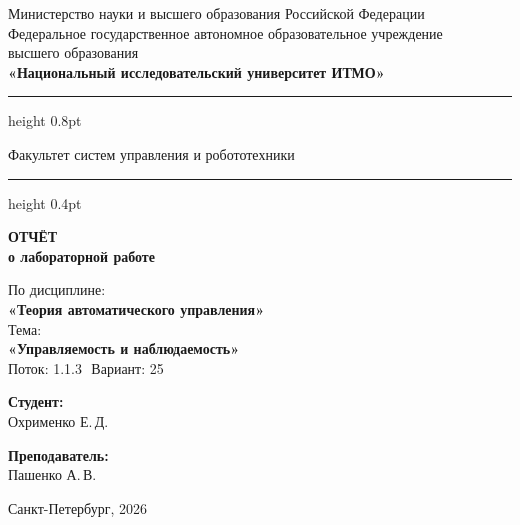 \documentclass[a4paper,12pt]{article}
\begin{document}
	
	\begin{titlepage}
		\centering
		
		\vspace*{0.5cm}
		{\small
			Министерство науки и высшего образования Российской Федерации\\[2pt]
			Федеральное государственное автономное образовательное учреждение\\
			высшего образования\\[2pt]
			\textbf{«Национальный исследовательский университет ИТМО»}\\
		}
		
		\vspace{0.8cm}
		\hrule height 0.8pt
		\vspace{0.3cm}
		
		{\large Факультет систем управления и робототехники}
		
		\vspace{0.3cm}
		\hrule height 0.4pt
		
		\vspace{2.5cm}
		
		{\Huge\bfseries ОТЧЁТ}\\[0.4cm]
		{\LARGE\bfseries о лабораторной работе}\\[0.8cm]
		
		\begin{tcolorbox}[
			colback=gray!4,
			colframe=gray!10,
			boxrule=0.8pt,
			arc=4pt,
			left=12pt, right=12pt, top=8pt, bottom=8pt
			]
			\centering
			{\large По дисциплине:\\[4pt]}
			{\large\bfseries «Теория автоматического управления»}\\[10pt]
			{\large Тема:\\[4pt]}
			{\large\bfseries «Управляемость и наблюдаемость»} \\[10pt]
			{\large Поток: 1.1.3 \( \) Вариант: 25}
		\end{tcolorbox}
		
		\vspace{3cm}
		
		\begin{minipage}{0.45\textwidth}
			\raggedright
			{\large\bfseries Студент:}\\[4pt]
			Охрименко Е.\,Д.\\
		\end{minipage}
		\hfill
		\begin{minipage}{0.45\textwidth}
			\raggedleft
			{\large\bfseries Преподаватель:}\\[4pt]
			Пашенко А.\,В.\\
		\end{minipage}
		
		\vfill
		
	
		\vspace{0.4cm}
		
		{\large Санкт-Петербург, 2026}
		
	\end{titlepage}
	
\end{document}
